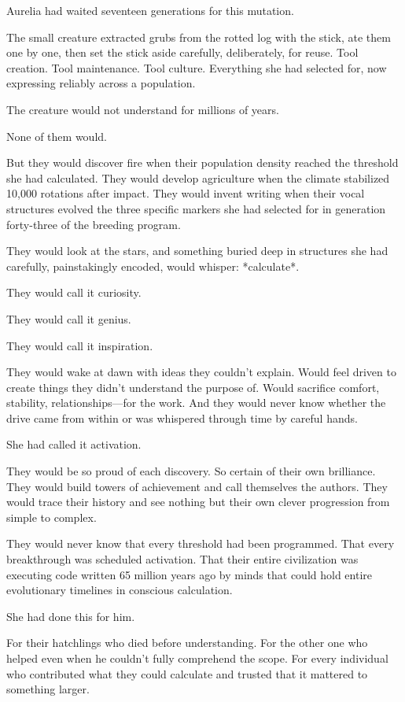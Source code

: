 Aurelia had waited seventeen generations for this mutation.

\scenebreak

The small creature extracted grubs from the rotted log with the stick, ate them one by one, then set the stick aside carefully, deliberately, for reuse. Tool creation. Tool maintenance. Tool culture. Everything she had selected for, now expressing reliably across a population.

The creature would not understand for millions of years.

None of them would.

But they would discover fire when their population density reached the threshold she had calculated. They would develop agriculture when the climate stabilized 10,000 rotations after impact. They would invent writing when their vocal structures evolved the three specific markers she had selected for in generation forty-three of the breeding program.

They would look at the stars, and something buried deep in structures she had carefully, painstakingly encoded, would whisper: *calculate*.

They would call it curiosity.

They would call it genius.

They would call it inspiration.

They would wake at dawn with ideas they couldn't explain. Would feel driven to create things they didn't understand the purpose of. Would sacrifice comfort, stability, relationships—for the work. And they would never know whether the drive came from within or was whispered through time by careful hands.

She had called it activation.

They would be so proud of each discovery. So certain of their own brilliance. They would build towers of achievement and call themselves the authors. They would trace their history and see nothing but their own clever progression from simple to complex.

They would never know that every threshold had been programmed. That every breakthrough was scheduled activation. That their entire civilization was executing code written 65 million years ago by minds that could hold entire evolutionary timelines in conscious calculation.

She had done this for him.

For their hatchlings who died before understanding. For the other one who helped even when he couldn't fully comprehend the scope. For every individual who contributed what they could calculate and trusted that it mattered to something larger.

